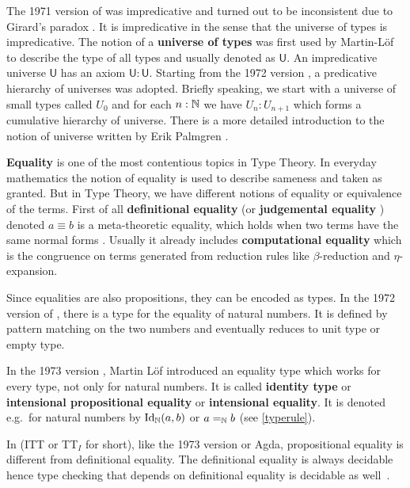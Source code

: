 The 1971 version of \mltt \cite{per:71} was impredicative and turned out to be inconsistent due to Girard's paradox \cite{hurkens1995simplification}. It is impredicative in the sense that the universe of types is impredicative. The notion of a \textbf{universe of types} was first used by Martin-L\"{o}f \cite{Martin-Lof-1973} to describe the type of all types and usually denoted as $\mathsf{U}$. An impredicative universe $\mathsf{U}$ has an axiom $\mathsf{U} : \mathsf{U}$.
Starting from the 1972 version \cite{Martin-Lof-1972}, a predicative hierarchy of universes was adopted. Briefly speaking, we start with a universe of small types called $U_0$ and for each $n : \mathbb{N}$ we have $U_n : U_{n+1}$ which forms a cumulative hierarchy of universe. There is a more detailed introduction to the notion of universe written by Erik Palmgren \cite{Palmgren98onuniverses}.


\textbf{Equality} is one of the most contentious topics in Type Theory.
In everyday mathematics the notion of equality is used to describe sameness and taken as granted.
But in Type Theory, we have different notions of equality or equivalence of the terms.
First of all \textbf{definitional equality} (or \textbf{judgemental equality} \cite{martin1984intuitionistic}) denoted $a \equiv b$ is a meta-theoretic equality, which holds when two terms have the same normal forms \cite{nor:90}. Usually it already includes \textbf{computational equality} which is the congruence on terms generated from reduction rules like $\beta$-reduction and $\eta$-expansion.


Since equalities are also propositions, they can be encoded as types.
In the 1972 version of \mltt, there is a type for the equality of natural numbers. It is defined by pattern matching on the two numbers and eventually reduces to unit type or empty type.

In the 1973 version \cite{Martin-Lof-1973}, Martin L\"{o}f introduced an equality type which works for every type, not only for natural numbers. It is called \textbf{identity type} or \textbf{intensional propositional equality} or \textbf{intensional equality}. It is denoted e.g.\ for natural numbers by $\text{Id}_{\mathbb{N}}(a, b)$ or $a =_{\mathbb{N}} b$ (see \autoref{typerule}).


In \itt (ITT or TT$_I$ for short), like the 1973 version or Agda, propositional equality is different from definitional equality. 
The definitional equality is always decidable hence type checking that depends on definitional equality is
decidable as well~\cite{alti:lics99}.



